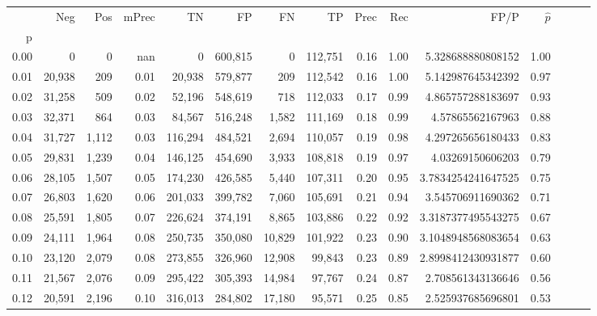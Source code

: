 \begin{tabular}{rrrrrrrrrrrrrrr}
\toprule
{} &     Neg &    Pos & mPrec &       TN &       FP &       FN &       TP &  Prec &   Rec &                    FP/P & $\hat{p}$ \\
p    &         &        &       &          &          &          &          &       &       &                         &           \\
\midrule
0.00 &       0 &      0 &   nan &        0 &  600,815 &        0 &  112,751 &  0.16 &  1.00 &       5.328688880808152 &      1.00 \\
0.01 &  20,938 &    209 &  0.01 &   20,938 &  579,877 &      209 &  112,542 &  0.16 &  1.00 &       5.142987645342392 &      0.97 \\
0.02 &  31,258 &    509 &  0.02 &   52,196 &  548,619 &      718 &  112,033 &  0.17 &  0.99 &       4.865757288183697 &      0.93 \\
0.03 &  32,371 &    864 &  0.03 &   84,567 &  516,248 &    1,582 &  111,169 &  0.18 &  0.99 &        4.57865562167963 &      0.88 \\
0.04 &  31,727 &  1,112 &  0.03 &  116,294 &  484,521 &    2,694 &  110,057 &  0.19 &  0.98 &       4.297265656180433 &      0.83 \\
0.05 &  29,831 &  1,239 &  0.04 &  146,125 &  454,690 &    3,933 &  108,818 &  0.19 &  0.97 &        4.03269150606203 &      0.79 \\
0.06 &  28,105 &  1,507 &  0.05 &  174,230 &  426,585 &    5,440 &  107,311 &  0.20 &  0.95 &      3.7834254241647525 &      0.75 \\
0.07 &  26,803 &  1,620 &  0.06 &  201,033 &  399,782 &    7,060 &  105,691 &  0.21 &  0.94 &       3.545706911690362 &      0.71 \\
0.08 &  25,591 &  1,805 &  0.07 &  226,624 &  374,191 &    8,865 &  103,886 &  0.22 &  0.92 &      3.3187377495543275 &      0.67 \\
0.09 &  24,111 &  1,964 &  0.08 &  250,735 &  350,080 &   10,829 &  101,922 &  0.23 &  0.90 &      3.1048948568083654 &      0.63 \\
0.10 &  23,120 &  2,079 &  0.08 &  273,855 &  326,960 &   12,908 &   99,843 &  0.23 &  0.89 &      2.8998412430931877 &      0.60 \\
0.11 &  21,567 &  2,076 &  0.09 &  295,422 &  305,393 &   14,984 &   97,767 &  0.24 &  0.87 &       2.708561343136646 &      0.56 \\
0.12 &  20,591 &  2,196 &  0.10 &  316,013 &  284,802 &   17,180 &   95,571 &  0.25 &  0.85 &       2.525937685696801 &      0.53 \\

\end{tabular}
